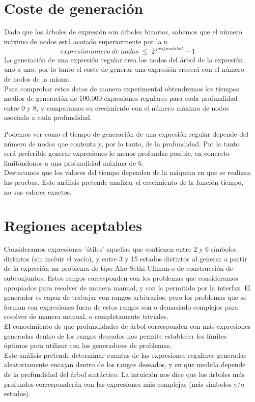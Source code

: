 \section{Coste de generación}

Dado que los árboles de expresión son árboles binarios, sabemos que el número máximo de nodos está acotado superiormente por la n
\[
expresi\acute{o}n\acute{u}mero \; de \; nodos \; \leq \; 2^{\;profundidad} - 1
\]
La generación de una expresión regular crea los nodos del árbol de la expresión uno a uno, por lo tanto el coste de generar una expresión crecerá con el número de nodos de la misma.
\\
Para comprobar estos datos de manera experimental obtendremos los tiempos medios de generación de 100.000 expresiones regulares para cada profundidad entre 0 y 8, y comparamos su crecimiento con el número máximo de nodos asociado a cada profundidad.


Podemos ver como el tiempo de generación de una expresión regular depende del número de nodos que contenta y, por lo tanto, de la profundidad.
Por lo tanto será preferible generar expresiones lo menos profundas posible, en concreto limitándonos a una profundidad máxima de 6.
\\
Destacamos que los valores del tiempo dependen de la máquina en que se realizan las pruebas.
Este análisis pretende analizar el crecimiento de la función tiempo, no sus valores exactos.

\section{Regiones aceptables}

Consideramos expresiones 'útiles' aquellas que contienen entre 2 y 6 símbolos distintos (sin incluir el vacío), y entre 3 y 15 estados distintos al generar a partir de la expresión un problema de tipo Aho-Sethi-Ullman o de construcción de subconjuntos.
Estos rangos corresponden con los problemas que consideramos apropiados para resolver de manera manual, y con lo permitido por la interfaz.
El generador es capaz de trabajar con rangos arbitrarios, pero los problemas que se forman con expresiones fuera de estos rangos son o demasiado complejos para resolver de manera manual, o completamente triviales.
\\
El conocimiento de que profundidades de árbol corresponden con más expresiones generadas dentro de los rangos deseados nos permite establecer los límites óptimos para utilizar con los generadores de problemas.
\\
Este análisis pretende determinar cuantas de las expresiones regulares generadas aleatoriamente encajan dentro de los rangos deseados, y en que medida depende de la profundidad del árbol sintáctico.
La intuición nos dice que los árboles más profundos corresponderán con las expresiones más complejas (más símbolos y/o estados).

